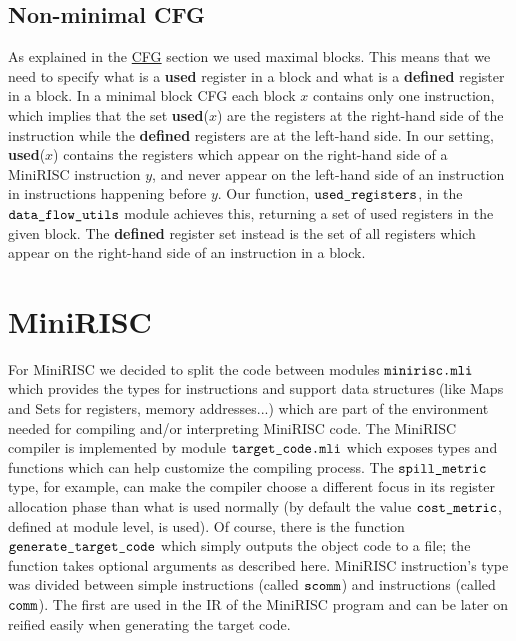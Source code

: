 \documentclass[a4paper,11pt]{report}
\begin{document}
\subsection{Non-minimal CFG}

As explained in the \hyperref[Section::CFG]{CFG} section we used maximal blocks. This means that we need to specify what is a \textbf{used} register in a block and what is a \textbf{defined} register in a block. In a minimal block CFG each block $x$ contains only one instruction, which implies that the set \textbf{used}($x$) are the registers at the right-hand side of the instruction while the \textbf{defined} registers are at the left-hand side. 
In our setting, \textbf{used}($x$) contains the registers which appear on the right-hand side of a MiniRISC instruction $y$, and never appear on the left-hand side of an instruction in instructions happening before $y$.
Our function, $\verb|used_registers|$, in the $\verb|data_flow_utils|$ module achieves this, returning a set of used registers in the given block.
The \textbf{defined} register set instead is the set of all registers which appear on the right-hand side of an instruction in a block.

\section{MiniRISC}\label{Section::MiniRISC}


For MiniRISC we decided to split the code between modules $\verb|minirisc.mli|$ which provides the types for instructions and support data structures (like Maps and Sets for registers, memory addresses...) which are part of the environment needed for compiling and/or interpreting MiniRISC code.
The MiniRISC compiler is implemented by module $\verb|target_code.mli|$ which exposes types and functions which can help customize the compiling process. The $\verb|spill_metric|$ type,  for example, can make the compiler choose a different focus in its register allocation phase than what is used normally (by default the value $\verb|cost_metric|$, defined at module level, is used).
Of course, there is the function $\verb|generate_target_code|$ which simply outputs the object code to a file; the function takes optional arguments as described here.
MiniRISC instruction's type was divided between simple instructions (called $\verb|scomm|$) and instructions (called $\verb|comm|$). The first are used in the IR of the MiniRISC program and can be later on reified easily when generating the target code.
\end{document}
